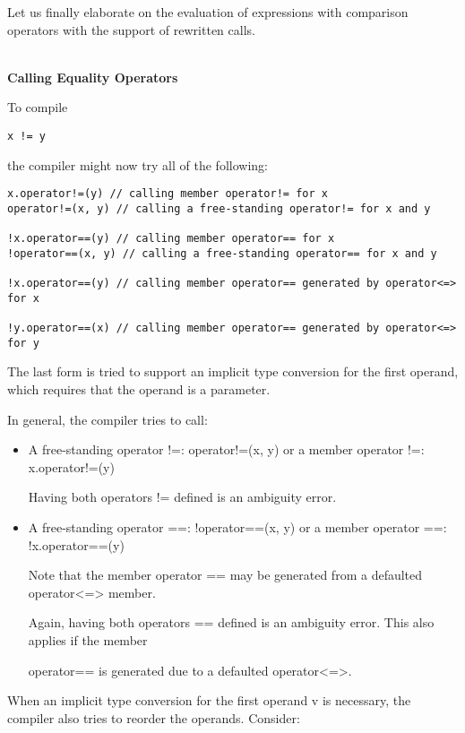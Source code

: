 Let us finally elaborate on the evaluation of expressions with comparison operators with the support of rewritten calls.


\noindent
\hspace*{\fill} \\ %
\textbf{Calling Equality Operators}

To compile

\begin{lstlisting}[style=styleCXX]
x != y
\end{lstlisting}

the compiler might now try all of the following:

\begin{lstlisting}[style=styleCXX]
x.operator!=(y) // calling member operator!= for x
operator!=(x, y) // calling a free-standing operator!= for x and y

!x.operator==(y) // calling member operator== for x
!operator==(x, y) // calling a free-standing operator== for x and y

!x.operator==(y) // calling member operator== generated by operator<=> for x

!y.operator==(x) // calling member operator== generated by operator<=> for y
\end{lstlisting}

The last form is tried to support an implicit type conversion for the first operand, which requires that the operand is a parameter.

In general, the compiler tries to call:

\begin{itemize}
\item
A free-standing operator !=: operator!=(x, y) or a member operator !=: x.operator!=(y)

Having both operators != defined is an ambiguity error.

\item
A free-standing operator ==: !operator==(x, y) or a member operator ==: !x.operator==(y)

Note that the member operator == may be generated from a defaulted operator<=> member.

Again, having both operators == defined is an ambiguity error. This also applies if the member

operator== is generated due to a defaulted operator<=>.
\end{itemize}

When an implicit type conversion for the first operand v is necessary, the compiler also tries to reorder the operands. Consider:

